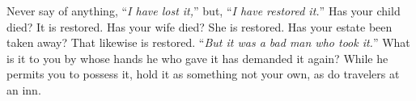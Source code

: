 Never say of anything, ``\emph{I have lost it,}'' but, ``\emph{I have restored it.}'' Has
your child died? It is restored. Has your wife died? She is restored. Has
your estate been taken away? That likewise is restored. ``\emph{But it was a bad
man who took it.}'' What is it to you by whose hands he who gave it has
demanded it again? While he permits you to possess it, hold it as
something not your own, as do travelers at an inn.
